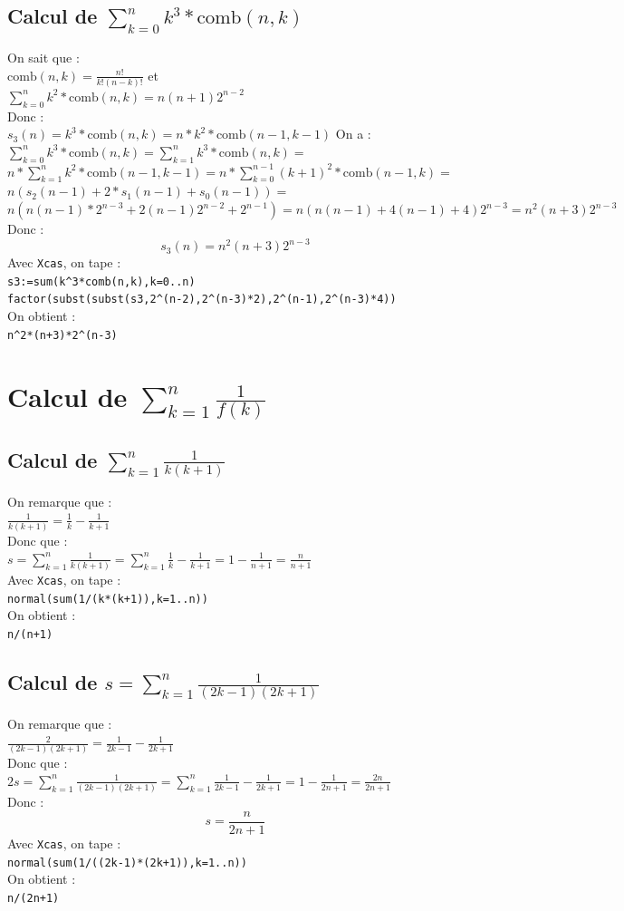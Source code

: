 \documentclass[a4paper,11pt]{book}
\begin{document}
\subsection{Calcul de $\sum_{k=0}^nk^3*\mbox{comb}(n,k)$}
On sait que :\\
$\mbox{comb}(n,k)=\frac{n!}{k!(n-k)!}$ et\\
$\sum_{k=0}^nk^2*\mbox{comb}(n,k)=n(n+1)2^{n-2}$\\
Donc :\\
$s_3(n)=k^3*\mbox{comb}(n,k)=n*k^2*\mbox{comb}(n-1,k-1)$
On a  :\\
$\sum_{k=0}^nk^3*\mbox{comb}(n,k)=\sum_{k=1}^nk^3*\mbox{comb}(n,k)=$\\
$n*\sum_{k=1}^nk^2*\mbox{comb}(n-1,k-1)=n*\sum_{k=0}^{n-1}(k+1)^2*\mbox{comb}(n-1,k)=$\\
$n(s_2(n-1)+2*s_1(n-1)+s_0(n-1))=$\\
$n(n(n-1)*2^{n-3}+2(n-1)2^{n-2}+2^{n-1})=n(n(n-1)+4(n-1)+4)2^{n-3}=n^2(n+3)2^{n-3}$\\
Donc :
$$s_3(n)=n^2(n+3)2^{n-3}$$
Avec {\tt Xcas}, on tape :\\
{\tt s3:=sum(k\verb|^|3*comb(n,k),k=0..n)}\\
{\tt factor(subst(subst(s3,2\verb|^|(n-2),2\verb|^|(n-3)*2),2\verb|^|(n-1),2\verb|^|(n-3)*4))}\\
On obtient :\\
{\tt n\verb|^|2*(n+3)*2\verb|^|(n-3)}
\section{Calcul de $\sum_{k=1}^n\frac{1}{f(k)}$}
\subsection{Calcul de $\sum_{k=1}^n\frac{1}{k(k+1)}$}
On remarque que :\\
$\frac{1}{k(k+1)}=\frac{1}{k}-\frac{1}{k+1}$\\
Donc que :\\
$s=\sum_{k=1}^n\frac{1}{k(k+1)}=\sum_{k=1}^n\frac{1}{k}-\frac{1}{k+1}=1-\frac{1}{n+1}=\frac{n}{n+1}$\\
Avec {\tt Xcas}, on tape :\\
{\tt normal(sum(1/(k*(k+1)),k=1..n))}\\
On obtient :\\
{\tt n/(n+1)}

\subsection{Calcul de $s=\sum_{k=1}^n\frac{1}{(2k-1)(2k+1)}$}
On remarque que :\\
$\frac{2}{(2k-1)(2k+1)}=\frac{1}{2k-1}-\frac{1}{2k+1}$\\
Donc que :\\
$2s=\sum_{k=1}^n\frac{1}{(2k-1)(2k+1)}=\sum_{k=1}^n\frac{1}{2k-1}-\frac{1}{2k+1}=1-\frac{1}{2n+1}=\frac{2n}{2n+1}$\\
Donc :
$$s=\frac{n}{2n+1}$$
Avec {\tt Xcas}, on tape :\\
{\tt normal(sum(1/((2k-1)*(2k+1)),k=1..n))}\\
On obtient :\\
{\tt n/(2n+1)}
\end{document}
